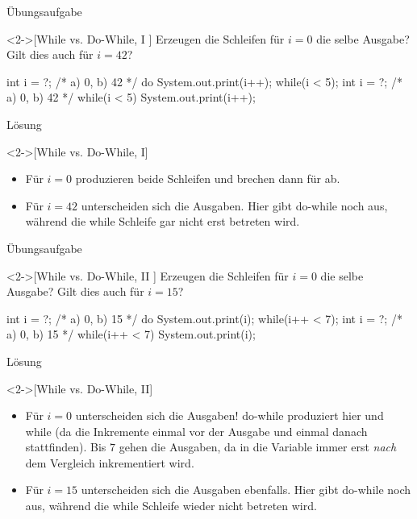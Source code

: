 \ifull
\begin{frame}[c,fragile]{Übungsaufgabe}
\begin{exercise}<2->[While vs. Do-While, I ]
    Erzeugen die Schleifen für \(i = 0\) die selbe Ausgabe?\pause{}
    Gilt dies auch für \(i = 42\)?\pause
\begin{plainjava}[multicols=2,aboveskip=0pt]
int i = ?; /* a) 0, b) 42 */
do {
    System.out.print(i++);
} while(i < 5);
int i = ?; /* a) 0, b) 42 */
while(i < 5) {
    System.out.print(i++);
}
\end{plainjava}
\end{exercise}
\end{frame}

\begin{frame}[c,fragile]{Lösung}
    \begin{solve}<2->[While vs. Do-While, I]
        \begin{itemize}[<+(1)->]
        \item Für \(i = 0\) produzieren beide Schleifen  und brechen dann für  ab.
        \item Für \(i = 42\) unterscheiden sich die Ausgaben. Hier gibt do-while noch  aus, während die while Schleife gar nicht erst betreten wird.
        \end{itemize}
    \end{solve}
\end{frame}

\begin{frame}[c,fragile]{Übungsaufgabe}
    \begin{exercise}<2->[While vs. Do-While, II ]
        Erzeugen die Schleifen für \(i = 0\) die selbe Ausgabe?\pause{}
        Gilt dies auch für \(i = 15\)?\pause
    \begin{plainjava}[multicols=2,aboveskip=0pt]
int i = ?; /* a) 0, b) 15 */
do {
    System.out.print(i);
} while(i++ < 7);
int i = ?; /* a) 0, b) 15 */
while(i++ < 7) {
    System.out.print(i);
}
    \end{plainjava}
    \end{exercise}
    \end{frame}

    \begin{frame}[c,fragile]{Lösung}
        \begin{solve}<2->[While vs. Do-While, II]
            \begin{itemize}[<+(1)->]
            \item Für \(i = 0\) unterscheiden sich die Ausgaben! do-while produziert hier  und while  (da die Inkremente einmal vor der Ausgabe und einmal danach stattfinden). Bis \(7\) gehen die Ausgaben, da in  die Variable  immer erst \emph{nach} dem Vergleich inkrementiert wird.
            \item Für \(i = 15\) unterscheiden sich die Ausgaben ebenfalls. Hier gibt do-while noch  aus, während die while Schleife wieder nicht betreten wird.
            \end{itemize}
        \end{solve}
    \end{frame}
\fi


